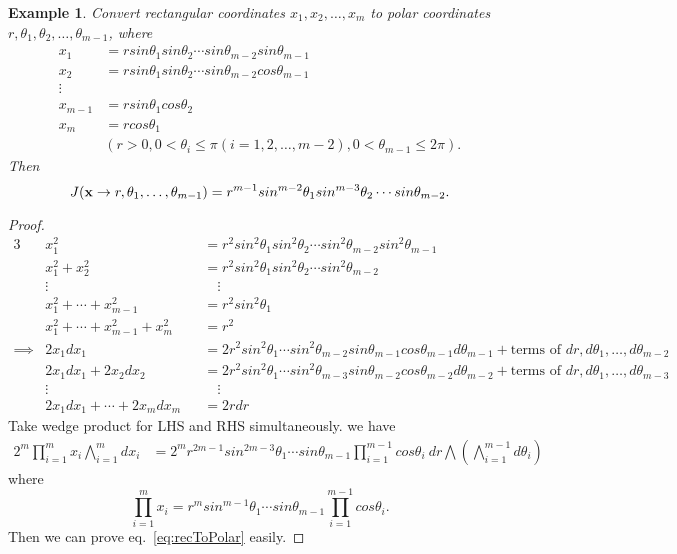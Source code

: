 \documentclass[11pt]{article}
\def\x{{\bf x}}
\newtheorem{example}{Example}[section]
\begin{document}
\begin{example}
	Convert rectangular coordinates $x_1,x_2,\dots, x_m$ to polar coordinates $r,\theta_1,\theta_2,\dots, \theta_{m-1}$, where
	\begin{align}
		x_1 &= r sin\theta_1 sin\theta_2\cdots sin\theta_{m-2} sin\theta_{m-1}\\
		x_2 &= r sin\theta_1 sin\theta_2\cdots sin\theta_{m-2} cos\theta_{m-1}\\	
		\vdots\\
		x_{m-1} &= r sin\theta_1 cos\theta_2\\
		x_m &= r cos\theta_1\\
		&(r>0, 0<\theta_i \leq \pi (i=1,2,\dots,m-2), 0< \theta_{m-1}\leq 2\pi).
	\end{align}
	Then 
	\begin{equation} \label{eq:recToPolar}
		J(\x\rightarrow r,\theta_1,\dots,\theta_{m-1}) = r^{m-1} sin^{m-2}\theta_1 sin^{m-3}\theta_2\cdots sin\theta_{m-2}.
	\end{equation}
\end{example}
\begin{proof}
	\begin{alignat*}{3}
		&x_1^2 &&= r^2 sin^2\theta_1 sin^2\theta_2 \cdots sin^2\theta_{m-2} sin^2\theta_{m-1}\\
		&x_1^2+x_2^2 &&= r^2 sin^2\theta_1 sin^2\theta_2 \cdots sin^2\theta_{m-2}\\
		&\vdots &&\quad \vdots\\
		&x_1^2+\cdots +x_{m-1}^2 &&= r^2 sin^2\theta_1\\
		&x_1^2+\cdots+x_{m-1}^2+x_m^2 &&= r^2\\
	\implies & 2x_1dx_1 &&= 2r^2 sin^2\theta_1 \cdots sin^2\theta_{m-2} sin\theta_{m-1} cos\theta_{m-1} d\theta_{m-1}+ \text{terms\ of\ } dr,d\theta_1,\dots, d\theta_{m-2}\\
		& 2x_1dx_1+2x_2dx_2 &&= 2r^2 sin^2\theta_1 \cdots sin^2\theta_{m-3} sin\theta_{m-2} cos\theta_{m-2} d\theta_{m-2}+ \text{terms\ of\ } dr,d\theta_1,\dots, d\theta_{m-3}\\
		&\vdots &&\quad \vdots\\
		& 2x_1dx_1+\cdots+2x_mdx_m  &&= 2rdr
	\end{alignat*}
	Take wedge product for LHS and RHS simultaneously. we have
	\begin{align}
		2^m\prod_{i=1}^m x_i \bigwedge_{i=1}^m dx_i &=  2^m r^{2m-1} sin^{2m-3}\theta_1\cdots sin\theta_{m-1} \prod_{i=1}^{m-1}cos\theta_i\ dr\bigwedge(\bigwedge_{i=1}^{m-1} d\theta_i)
	\end{align}
	where
	\begin{equation}
		\prod_{i=1}^m x_i = r^m sin^{m-1}\theta_1\cdots sin\theta_{m-1}\prod_{i=1}^{m-1} cos\theta_i.
	\end{equation}
	Then we can prove eq.~\ref{eq:recToPolar} easily.
\end{proof}
\end{document}
